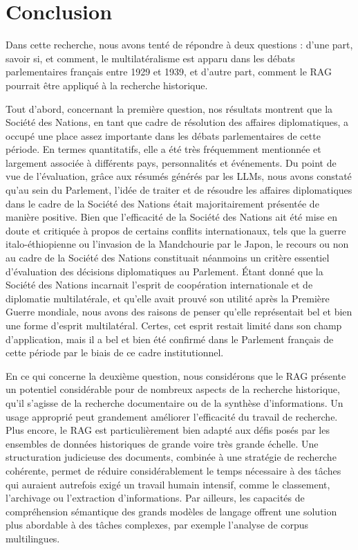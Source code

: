 \documentclass[a4paper,twoside,12pt]{book}
\begin{document}
\chapter{Conclusion}
Dans cette recherche, nous avons tenté de répondre à deux questions : d'une part, savoir si, et comment, le multilatéralisme est apparu dans les débats parlementaires français entre 1929 et 1939, et d'autre part, comment le RAG pourrait être appliqué à la recherche historique.

Tout d'abord, concernant la première question, nos résultats montrent que la Société des Nations, en tant que cadre de résolution des affaires diplomatiques, a occupé une place assez importante dans les débats parlementaires de cette période. En termes quantitatifs, elle a été très fréquemment mentionnée et largement associée à différents pays, personnalités et événements. Du point de vue de l'évaluation, grâce aux résumés générés par les LLMs, nous avons constaté qu'au sein du Parlement, l'idée de traiter et de résoudre les affaires diplomatiques dans le cadre de la Société des Nations était majoritairement présentée de manière positive. Bien que l'efficacité de la Société des Nations ait été mise en doute et critiquée à propos de certains conflits internationaux, tels que la guerre italo-éthiopienne ou l'invasion de la Mandchourie par le Japon, le recours ou non au cadre de la Société des Nations constituait néanmoins un critère essentiel d'évaluation des décisions diplomatiques au Parlement. Étant donné que la Société des Nations incarnait l'esprit de coopération internationale et de diplomatie multilatérale, et qu'elle avait prouvé son utilité après la Première Guerre mondiale, nous avons des raisons de penser qu'elle représentait bel et bien une forme d'esprit multilatéral. Certes, cet esprit restait limité dans son champ d'application, mais il a bel et bien été confirmé dans le Parlement français de cette période par le biais de ce cadre institutionnel.

En ce qui concerne la deuxième question, nous considérons que le RAG présente un potentiel considérable pour de nombreux aspects de la recherche historique, qu'il s'agisse de la recherche documentaire ou de la synthèse d'informations. Un usage approprié peut grandement améliorer l'efficacité du travail de recherche. Plus encore, le RAG est particulièrement bien adapté aux défis posés par les ensembles de données historiques de grande voire très grande échelle. Une structuration judicieuse des documents, combinée à une stratégie de recherche cohérente, permet de réduire considérablement le temps nécessaire à des tâches qui auraient autrefois exigé un travail humain intensif, comme le classement, l'archivage ou l'extraction d'informations. Par ailleurs, les capacités de compréhension sémantique des grands modèles de langage offrent une solution plus abordable à des tâches complexes, par exemple l'analyse de corpus multilingues.
\end{document}
